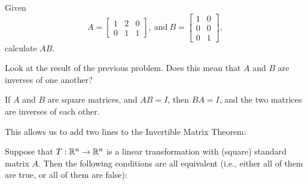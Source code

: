 
Given 
\[A = \left[ \begin{array}{ccc} 1 & 2 & 0  \\
0 & 1 & 1
 \end{array} \right], \  \mathrm{and} \ B = \left[ \begin{array}{cc} 1 & 0  \\
0 & 0 \\
0 & 1
 \end{array} \right], \]
calculate $AB$.  





\edXsolution{

}

\endedxproblem


Look at the result of the previous problem.  
Does this mean that $A$ and $B$ are inverses of one another?




\endedxproblem


\endedxvertical





{}  If  $A$ and $B$ are square matrices, and 
$AB = I$, then $BA = I$, and the two matrices are inverses of each other.  


This allows us to add two lines to the Invertible Matrix Theorem: 

{}  
Suppose that $T: \mathbb R^n \rightarrow \mathbb R^n$ is a linear transformation
with (square) standard matrix $A$.  Then the following conditions are all equivalent (i.e., either all of
them are true, or all of them are false):

